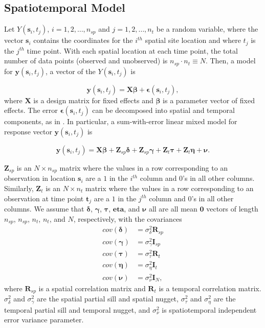 \documentclass[]{interact}
\theoremstyle{plain}%
\theoremstyle{definition}
\theoremstyle{remark}
\begin{document}
\subsection{Spatiotemporal Model}

Let \(Y(\mathbf{s}_{i}, t_j)\), \(i = 1, 2, \ldots, n_{sp}\) and
\(j = 1, 2, \ldots, n_{t}\) be a random variable, where the vector
\(\mathbf{s}_i\) contains the coordinates for the \(i^{th}\) spatial
site location and where \(t_j\) is the \(j^{th}\) time point. With each
spatial location at each time point, the total number of data points
(observed and unobserved) is \(n_{sp} \cdot n_{t} \equiv N\). Then, a
model for \(\mathbf{y}(\mathbf{s}_{i}, t_j)\), a vector of the
\(Y(\mathbf{s}_{i}, t_j)\) is

\begin{equation}
\mathbf{y}(\mathbf{s}_{i}, t_j) = \mathbf{X} \bm{\beta} + \bm{\epsilon}(\mathbf{s}_{i}, t_j),
\end{equation} \noindent where \(\mathbf{X}\) is a design matrix for
fixed effects and \(\bm{\beta}\) is a parameter vector of fixed effects.
The error \(\bm{\epsilon}(\mathbf{s}_{i}, t_j)\) can be decomposed into
spatial and temporal components, as in \citet{dumelle2021linear}. In
particular, a sum-with-error linear mixed model for response vector
\(\mathbf{y}(\mathbf{s}_{i}, t_j)\) is

\begin{equation} \label{equation:model}
\mathbf{y}(\mathbf{s}_{i}, t_j) = \mathbf{X} \bm{\beta} + \mathbf{Z}_{sp} \bm{\delta} + \mathbf{Z}_{sp} \bm{\gamma} + \mathbf{Z}_t \bm{\tau} + \mathbf{Z}_t \bm{\eta} + \bm{\nu}.
\end{equation}

\(\mathbf{Z}_{sp}\) is an \(N \times n_{sp}\) matrix where the values in
a row corresponding to an observation in location \(\mathbf{s}_{i}\) are
a \(1\) in the \(i^{th}\) column and 0's in all other columns.
Similarly, \(\mathbf{Z}_t\) is an \(N \times n_{t}\) matrix where the
values in a row corresponding to an observation at time point
\(\mathbf{t}_j\) are a \(1\) in the \(j^{th}\) column and 0's in all
other columns. We assume that \(\bm{\delta}\), \(\bm{\gamma}\),
\(\bm{\tau}\), \(\bm{eta}\), and \(\bm{\nu}\) all are all mean
\(\mathbf{0}\) vectors of length \(n_{sp}\), \(n_{sp}\), \(n_t\),
\(n_t\), and \(N\), respectively, with the covariances \mbox{}
\begin{align*}
cov(\bm{\delta}) &= \sigma^2_{\delta} \mathbf{R}_{sp} \\
cov(\bm{\gamma}) &= \sigma^2_{\gamma} \mathbf{I}_{sp} \\
cov(\bm{\tau}) &= \sigma^2_{\tau} \mathbf{R}_t \\
cov(\bm{\eta}) &= \sigma^2_{\eta} \mathbf{I}_t \\
cov(\bm{\nu}) &= \sigma^2_{\nu} \mathbf{I}_N,
\end{align*} \noindent where \(\mathbf{R}_{sp}\) is a spatial
correlation matrix and \(\mathbf{R}_t\) is a temporal correlation
matrix. \(\sigma^2_{\delta}\) and \(\sigma^2_{\gamma}\) are the spatial
partial sill and spatial nugget, \(\sigma^2_{\tau}\) and
\(\sigma^2_{\eta}\) are the temporal partial sill and temporal nugget,
and \(\sigma^2_{\nu}\) is spatiotemporal independent error variance
parameter.
\end{document}
